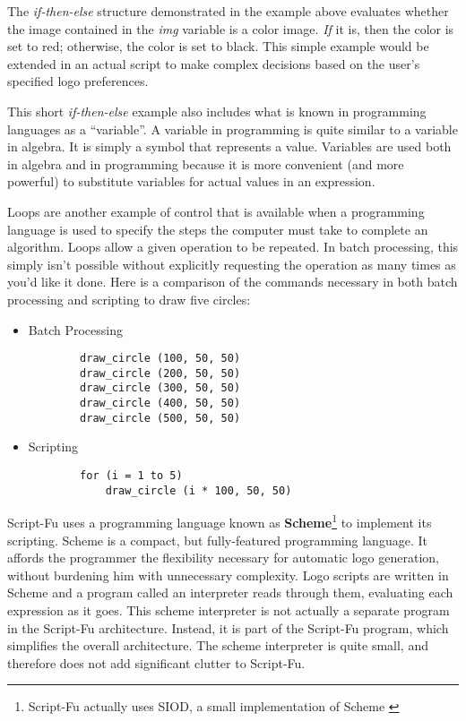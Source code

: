 \documentclass{article}
\begin{document}
The {\it if-then-else} structure demonstrated in the example above
evaluates whether the image contained in the {\it img} variable is a
color image.  {\it If} it is, then the color is set to red; otherwise,
the color is set to black.  This simple example would be extended in an
actual script to make complex decisions based on the user's specified
logo preferences.

This short {\it if-then-else} example also includes what is known in
programming languages as a ``variable''.  A variable in programming is
quite similar to a variable in algebra.  It is simply a symbol that
represents a value.  Variables are used both in algebra and in
programming because it is more convenient (and more powerful) to
substitute variables for actual values in an expression.

Loops are another example of control that is available when a
programming language is used to specify the steps the computer must
take to complete an algorithm.  Loops allow a given operation to be
repeated.  In batch processing, this simply isn't possible without
explicitly requesting the operation as many times as you'd like it
done.  Here is a comparison of the commands necessary in both batch
processing and scripting to draw five circles:

\begin{itemize}
\item Batch Processing\\
{\scriptsize
\begin{verbatim}
        draw_circle (100, 50, 50)
        draw_circle (200, 50, 50)
        draw_circle (300, 50, 50)
        draw_circle (400, 50, 50)
        draw_circle (500, 50, 50)
\end{verbatim}}
\item Scripting\\
{\scriptsize
\begin{verbatim}
        for (i = 1 to 5)
            draw_circle (i * 100, 50, 50)
\end{verbatim}}
\end{itemize}

Script-Fu uses a programming language known as {\bf
Scheme}\footnote{Script-Fu actually uses SIOD, a small implementation
of Scheme \cite{siod}} \cite{scheme} to implement its scripting.
Scheme is a compact, but fully-featured programming language.  It
affords the programmer the flexibility necessary for automatic logo
generation, without burdening him with unnecessary complexity.  Logo
scripts are written in Scheme and a program called an interpreter
reads through them, evaluating each expression as it goes.  This
scheme interpreter is not actually a separate program in the Script-Fu
architecture.  Instead, it is part of the Script-Fu program, which
simplifies the overall architecture.  The scheme interpreter is quite
small, and therefore does not add significant clutter to Script-Fu.
\end{document}
